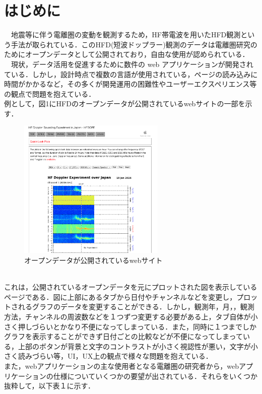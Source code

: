\section{はじめに}

　地震等に伴う電離圏の変動を観測するため，HF帯電波を用いたHFD観測という手法が取られている．このHFD(短波ドップラー)観測のデータは電離圏研究のためにオープンデータとして公開されており，自由な使用が認められている．\cite{hfd_report}\\
　現状，データ活用を促進するために数件の web アプリケーションが開発されている．しかし，設計時点で複数の言語が使用されている，ページの読み込みに時間がかかるなど，その多くが開発運用の困難性やユーザーエクスペリエンス等の観点で問題を抱えている．\\
 例として，図1にHFDのオープンデータが公開されているwebサイトの一部を示す．\cite{hfd_link}\\
 \begin{figure}[h]
   \centering
   \includegraphics[width=70mm]{fig/websc.png}
   \caption{オープンデータが公開されているwebサイト}
 \end{figure}\\
 これは，公開されているオープンデータを元にプロットされた図を表示しているページである．図に上部にあるタブから日付やチャンネルなどを変更し，プロットされるグラフのデータを変更することができる．しかし，観測年，月，，観測方法，チャンネルの周波数などを１つずつ変更する必要がある上，タブ自体が小さく押しづらいとかなり不便になってしまっている．また，同時に１つまでしかグラフを表示することができず日付ごとの比較などが不便になってしまっている，上部のボタンが背景と文字のコントラストが小さく視認性が悪い，文字が小さく読みづらい等，UI，UX上の観点で様々な問題を抱えている．\\
また，webアプリケーションの主な使用者となる電離圏の研究者から，webアプリケーションの仕様についていくつかの要望が出されている．それらをいくつか抜粋して，以下表１に示す．\\
